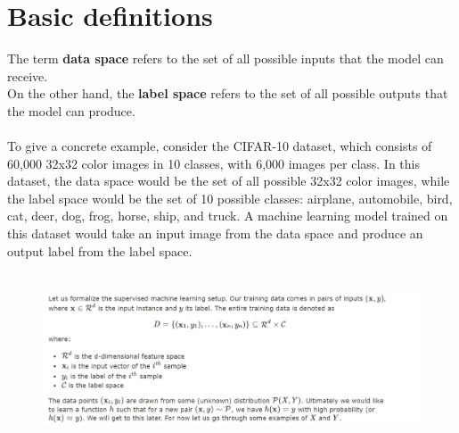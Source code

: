 \documentclass{article}
\begin{document}
\section {Basic definitions}
The term \textbf{data space} refers to the set of all possible inputs that the model can receive.\\
On the other hand, the \textbf{label space} refers to the set of all possible outputs that the model can produce.\\\\
To give a concrete example, consider the CIFAR-10 dataset, which consists of 60,000 32x32 color images in 10 classes, with 6,000 images per class.
In this dataset, the data space would be the set of all possible 32x32 color images, while the label space would be the set of 10 possible classes: airplane, automobile, bird, cat, deer, dog, frog, horse, ship, and truck.
A machine learning model trained on this dataset would take an input image from the data space and produce an output label from the label space.\\\\
\begin{figure}[!ht]
    \centering
    \includegraphics[width=\textwidth]{./images/p63_img322.png}
\end{figure}
\end{document}
